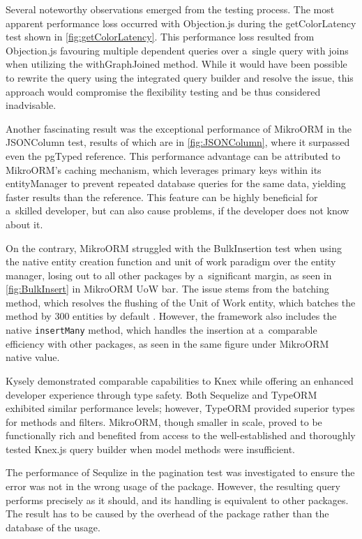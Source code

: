 Several noteworthy observations emerged from the testing process. The most
apparent performance loss occurred with Objection.js during the getColorLatency
test shown in \autoref{fig:getColorLatency}. This performance loss resulted from
Objection.js favouring multiple dependent queries over a~single query with joins
when utilizing the withGraphJoined method. While it would have been possible to
rewrite the query using the integrated query builder and resolve the issue, this
approach would compromise the flexibility testing and be thus considered
inadvisable.

Another fascinating result was the exceptional performance of MikroORM in the
JSONColumn test, results of which are in \autoref{fig:JSONColumn}, where it
surpassed even the pgTyped reference. This performance advantage can be
attributed to MikroORM's caching mechanism, which leverages primary keys within
its entityManager to prevent repeated database queries for the same data,
yielding faster results than the reference. This feature can be highly
beneficial for a~skilled developer, but can also cause problems, if the
developer does not know about it.

On the contrary, MikroORM struggled with the BulkInsertion test when using the
native entity creation function and unit of work paradigm over the entity
manager, losing out to all other packages by a~significant margin, as seen in
\autoref{fig:BulkInsert} in MikroORM UoW bar. The issue stems from the batching
method, which resolves the flushing of the Unit of Work entity, which batches
the method by 300 entities by default \cite{MikroORMBatching}. However, the
framework also includes the native \texttt{insertMany} method, which handles the
insertion at a~comparable efficiency with other packages, as seen in the same
figure under MikroORM native value.

Kysely demonstrated comparable capabilities to Knex while offering an enhanced
developer experience through type safety. Both Sequelize and TypeORM exhibited
similar performance levels; however, TypeORM provided superior types for methods
and filters. MikroORM, though smaller in scale, proved to be functionally rich
and benefited from access to the well-established and thoroughly tested Knex.js
query builder when model methods were insufficient.

The performance of Sequlize in the pagination test was investigated to ensure
the error was not in the wrong usage of the package. However, the resulting
query performs precisely as it should, and its handling is equivalent to other
packages. The result has to be caused by the overhead of the package rather than
the database of the usage.

